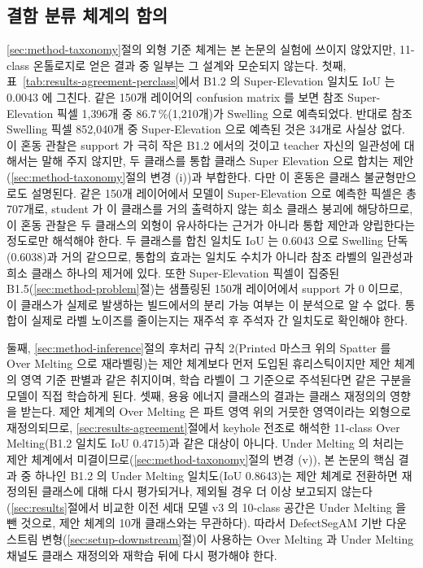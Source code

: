 \subsection{결함 분류 체계의 함의}
\label{sec:discussion-taxonomy}

\ref{sec:method-taxonomy}절의 외형 기준 체계는 본 논문의 실험에 쓰이지
않았지만, 11-class 온톨로지로 얻은 결과 중 일부는 그 설계와 모순되지
않는다. 첫째, 표~\ref{tab:results-agreement-perclass}에서 B1.2 의
Super-Elevation 일치도 IoU 는 0.0043 에 그친다. 같은 150개 레이어의
confusion matrix 를 보면 참조 Super-Elevation 픽셀 1{,}396개 중
86.7\,\%(1{,}210개)가 Swelling 으로 예측되었다. 반대로 참조 Swelling 픽셀
852{,}040개 중 Super-Elevation 으로 예측된 것은 34개로 사실상 없다. 이
혼동 관찰은 support 가 극히 작은 B1.2 에서의 것이고 teacher 자신의
일관성에 대해서는 말해 주지 않지만, 두 클래스를 통합 클래스 Super
Elevation 으로 합치는 제안(\ref{sec:method-taxonomy}절의 변경 (i))과
부합한다. 다만 이 혼동은 클래스 불균형만으로도 설명된다. 같은 150개
레이어에서 모델이 Super-Elevation 으로 예측한 픽셀은 총 707개로, student
가 이 클래스를 거의 출력하지 않는 희소 클래스 붕괴에 해당하므로, 이 혼동
관찰은 두 클래스의 외형이 유사하다는 근거가 아니라 통합 제안과 양립한다는
정도로만 해석해야 한다. 두 클래스를 합친 일치도 IoU 는 0.6043
으로 Swelling 단독(0.6038)과 거의 같으므로, 통합의 효과는 일치도 수치가
아니라 참조 라벨의 일관성과 희소 클래스 하나의 제거에 있다. 또한
Super-Elevation 픽셀이 집중된 B1.5(\ref{sec:method-problem}절)는 샘플링된
150개 레이어에서 support 가 0 이므로, 이 클래스가 실제로 발생하는
빌드에서의 분리 가능
여부는 이 분석으로 알 수 없다. 통합이 실제로 라벨 노이즈를 줄이는지는
재주석 후 주석자 간 일치도로 확인해야 한다.

둘째, \ref{sec:method-inference}절의 후처리 규칙 2(Printed 마스크 위의
Spatter 를 Over Melting 으로 재라벨링)는 제안 체계보다 먼저 도입된
휴리스틱이지만 제안 체계의 영역 기준 판별과 같은 취지이며, 학습 라벨이 그
기준으로 주석된다면 같은 구분을 모델이 직접 학습하게 된다. 셋째, 용융
에너지 클래스의 결과는 클래스 재정의의 영향을 받는다. 제안 체계의 Over
Melting 은 파트 영역 위의 거뭇한 영역이라는 외형으로 재정의되므로,
\ref{sec:results-agreement}절에서 keyhole 전조로 해석한 11-class Over
Melting(B1.2 일치도 IoU 0.4715)과 같은 대상이 아니다. Under Melting 의
처리는 제안 체계에서 미결이므로(\ref{sec:method-taxonomy}절의 변경 (v)),
본 논문의 핵심 결과 중 하나인 B1.2 의 Under Melting 일치도(IoU 0.8643)는
제안 체계로 전환하면 재정의된 클래스에 대해 다시 평가되거나, 제외될 경우
더 이상 보고되지 않는다(\ref{sec:results}절에서 비교한 이전 세대 모델
v3 의 10-class 공간은 Under Melting 을 뺀 것으로, 제안 체계의 10개
클래스와는 무관하다). 따라서 DefectSegAM 기반 다운스트림
변형(\ref{sec:setup-downstream}절)이 사용하는 Over Melting 과 Under
Melting 채널도 클래스 재정의와 재학습 뒤에 다시 평가해야 한다.

